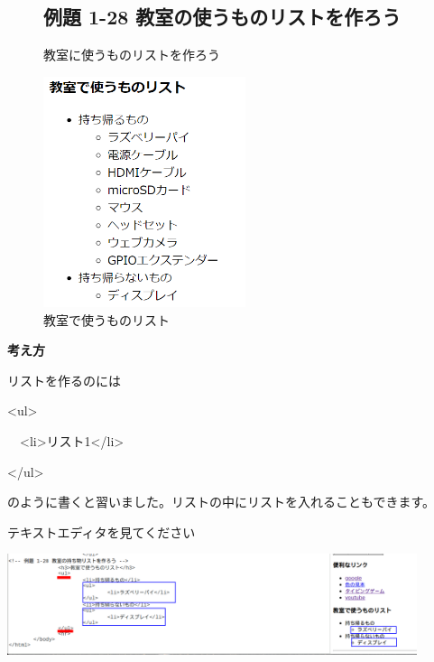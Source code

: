 \clearpage

\bigskip
\centering
\begin{figure}
  \subsection{例題 1-28 教室の使うものリストを作ろう}
  教室に使うものリストを作ろう
  \begin{minipage}{5.937cm}
    {\upshape
      \includegraphics[width=5.937cm]{text01-img/textbook-img203.png}
      \caption{教室で使うものリスト}
    }
  \end{minipage}
\end{figure}


\bigskip
\flushleft

\textbf{考え方}



リストを作るのには

{\textless}ul{\textgreater}

\ \ {\textless}li{\textgreater}リスト1{\textless}/li{\textgreater}

{\textless}/ul{\textgreater}

のように書くと習いました。リストの中にリストを入れることもできます。

テキストエディタを見てください

\bigskip

\centering
\includegraphics[width=0.9\textwidth]{text01-img/textbook-img204.png}

\bigskip
\flushleft

